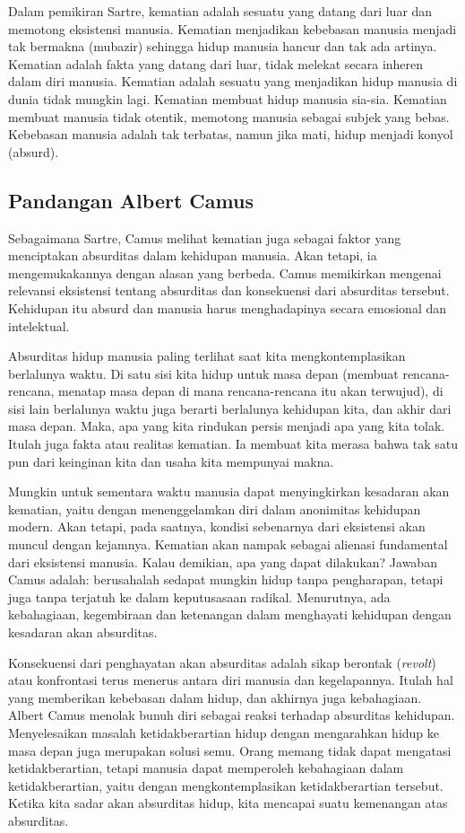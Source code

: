 \documentclass[11pt,twoside,a5paper,openany]{memoir}
\begin{document}
Dalam pemikiran Sartre, kematian adalah sesuatu yang datang dari luar
dan memotong eksistensi manusia. Kematian menjadikan kebebasan manusia
menjadi tak bermakna (mubazir) sehingga hidup manusia hancur dan tak ada
artinya. Kematian adalah fakta yang datang dari luar, tidak melekat
secara inheren dalam diri manusia. Kematian adalah sesuatu yang
menjadikan hidup manusia di dunia tidak mungkin lagi. Kematian membuat
hidup manusia sia-sia. Kematian membuat manusia tidak otentik, memotong
manusia sebagai subjek yang bebas. Kebebasan manusia adalah tak
terbatas, namun jika mati, hidup menjadi konyol (absurd).

\hypertarget{pandangan-albert-camus}{%
\subsection{Pandangan Albert Camus}\label{pandangan-albert-camus}}

Sebagaimana Sartre, Camus melihat kematian juga sebagai faktor yang
menciptakan absurditas dalam kehidupan manusia. Akan tetapi, ia
mengemukakannya dengan alasan yang berbeda. Camus memikirkan mengenai
relevansi eksistensi tentang absurditas dan konsekuensi dari absurditas
tersebut. Kehidupan itu absurd dan manusia harus menghadapinya secara
emosional dan intelektual.

Absurditas hidup manusia paling terlihat saat kita mengkontemplasikan
berlalunya waktu. Di satu sisi kita hidup untuk masa depan (membuat
rencana-rencana, menatap masa depan di mana rencana-rencana itu akan
terwujud), di sisi lain berlalunya waktu juga berarti berlalunya
kehidupan kita, dan akhir dari masa depan. Maka, apa yang kita rindukan
persis menjadi apa yang kita tolak. Itulah juga fakta atau realitas
kematian. Ia membuat kita merasa bahwa tak satu pun dari keinginan kita
dan usaha kita mempunyai makna.

Mungkin untuk sementara waktu manusia dapat menyingkirkan kesadaran akan
kematian, yaitu dengan menenggelamkan diri dalam anonimitas kehidupan
modern. Akan tetapi, pada saatnya, kondisi sebenarnya dari eksistensi
akan muncul dengan kejamnya. Kematian akan nampak sebagai alienasi
fundamental dari eksistensi manusia. Kalau demikian, apa yang dapat
dilakukan? Jawaban Camus adalah: berusahalah sedapat mungkin hidup tanpa
pengharapan, tetapi juga tanpa terjatuh ke dalam keputusasaan radikal.
Menurutnya, ada kebahagiaan, kegembiraan dan ketenangan dalam menghayati
kehidupan dengan kesadaran akan absurditas.

Konsekuensi dari penghayatan akan absurditas adalah sikap berontak
(\emph{revolt}) atau konfrontasi terus menerus antara diri manusia dan
kegelapannya. Itulah hal yang memberikan kebebasan dalam hidup, dan
akhirnya juga kebahagiaan. Albert Camus menolak bunuh diri sebagai
reaksi terhadap absurditas kehidupan. Menyelesaikan masalah
ketidakberartian hidup dengan mengarahkan hidup ke masa depan juga
merupakan solusi semu. Orang memang tidak dapat mengatasi
ketidakberartian, tetapi manusia dapat memperoleh kebahagiaan dalam
ketidakberartian, yaitu dengan mengkontemplasikan ketidakberartian
tersebut. Ketika kita sadar akan absurditas hidup, kita mencapai suatu
kemenangan atas absurditas.
\end{document}
